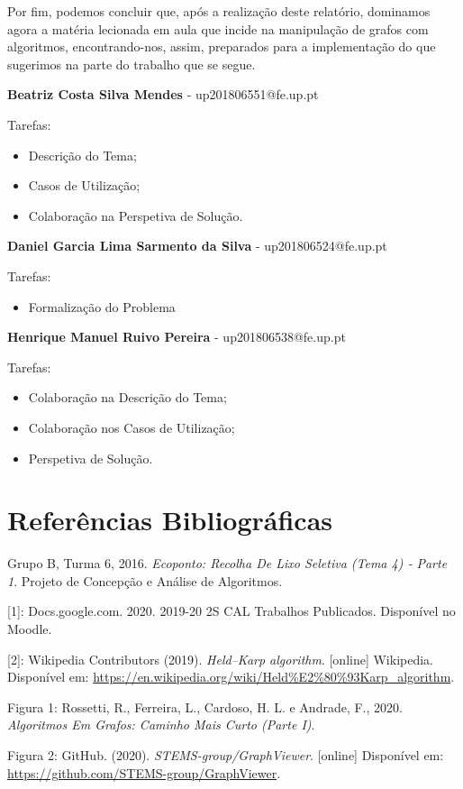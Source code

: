 \documentclass[article, a4paper, 12pt, oneside]{memoir}
\begin{document}
Por fim, podemos concluir que, após a realização deste relatório, dominamos agora a matéria lecionada em aula que incide na manipulação de grafos com algoritmos, encontrando-nos, assim, preparados para a implementação do que sugerimos na parte do trabalho que se segue.

\textbf{Beatriz Costa Silva Mendes} - up201806551@fe.up.pt

Tarefas:
\begin{itemize}
\item Descrição do Tema;
\item Casos de Utilização;
\item Colaboração na Perspetiva de Solução.
\end{itemize}

\textbf{Daniel Garcia Lima Sarmento da Silva} - up201806524@fe.up.pt

Tarefas:
\begin{itemize}
\item Formalização do Problema
\end{itemize}

\textbf{Henrique Manuel Ruivo Pereira} - up201806538@fe.up.pt

Tarefas:
\begin{itemize}
\item Colaboração na Descrição do Tema;
\item Colaboração nos Casos de Utilização;
\item Perspetiva de Solução.
\end{itemize}





\newpage
\chapter[Referências Bibliográficas][Referências Bibliográficas]{Referências Bibliográficas} \label{\thechapter}
Grupo B, Turma 6, 2016. \textit{Ecoponto: Recolha De Lixo Seletiva (Tema 4) ‐ Parte 1}. Projeto de Concepção e Análise de Algoritmos.

[1]: Docs.google.com. 2020. 2019-20 2S CAL Trabalhos Publicados. Disponível no Moodle.

[2]: Wikipedia Contributors (2019). \textit{Held–Karp algorithm}. [online] Wikipedia. Disponível em: \url{https://en.wikipedia.org/wiki/Held%E2%80%93Karp_algorithm}.

Figura 1: Rossetti, R., Ferreira, L., Cardoso, H. L. e Andrade, F., 2020. \textit{Algoritmos Em Grafos: Caminho Mais Curto (Parte I)}.

Figura 2: GitHub. (2020). \textit{STEMS-group/GraphViewer}. [online] Disponível em: \url{https://github.com/STEMS-group/GraphViewer}.

‌

‌

\newpage
\end{document}
